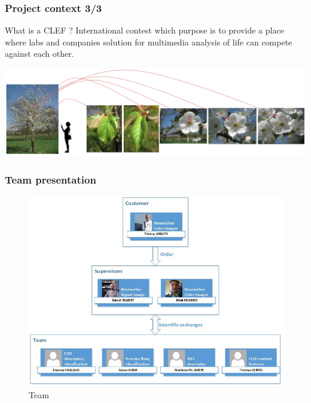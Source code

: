 \documentclass[xcolor=table]{beamer}
\begin{document}
\begin{frame} \frametitle{Project context 3/3}
\begin{block}{What is a CLEF ?}
	International contest which purpose is to provide a place where labs and companies solution for multimedia analysis of life can compete against each other.
\end{block}

	\includegraphics[scale=0.27]{OnePrunus.png}
\end{frame}

\begin{frame} \frametitle{Team presentation}

\begin{figure}[h]
    \center
    \includegraphics[scale=0.5]{Dessin1.jpg}
    \caption{Team}\label{fig:team}
\end{figure}

\end{frame}
\end{document}
